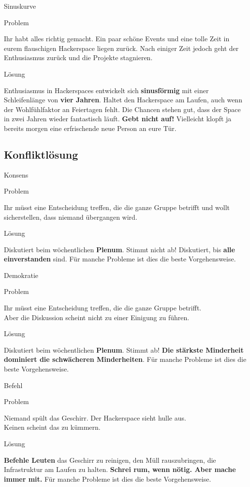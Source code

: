 \documentclass[aspectratio=1610]{beamer}
\newcommand{\pattern}[2]{
  \begin{alertblock}{Problem}
    #1
  \end{alertblock}
  \pause
  \begin{exampleblock}{Lösung}
    #2
  \end{exampleblock}
}
\begin{document}
  \begin{frame}{Sinuskurve}
    \pattern{
      Ihr habt alles richtig gemacht. Ein paar schöne Events und eine tolle
      Zeit in eurem flauschigen Hackerspace liegen zurück. Nach einiger Zeit
      jedoch geht der Enthusiasmus zurück und die Projekte stagnieren.
    }{
      Enthusiasmus in Hackerspaces entwickelt sich \textbf{sinusförmig} mit einer
      Schleifenlänge von \textbf{vier Jahren}. Haltet den Hackerspace am Laufen,
      auch wenn der Wohlfühlfaktor an Feiertagen fehlt. Die Chancen stehen gut,
      dass der Space in zwei Jahren wieder fantastisch läuft. \textbf{Gebt nicht
      auf!} Vielleicht klopft ja bereits morgen eine erfrischende neue Person
      an eure Tür.
    }
  \end{frame}

  \subsection{Konfliktlösung}

  \begin{frame}{Konsens}
    \pattern{
      Ihr müsst eine Entscheidung treffen, die die ganze Gruppe betrifft und
      wollt sicherstellen, dass niemand übergangen wird.
    }{
      Diskutiert beim wöchentlichen \textbf{Plenum}. Stimmt nicht ab!
      Diskutiert, bis \textbf{alle einverstanden} sind. Für manche Probleme ist
      dies die beste Vorgehensweise.
    }
  \end{frame}

  \begin{frame}{Demokratie}
    \pattern{
      Ihr müsst eine Entscheidung treffen, die die ganze Gruppe betrifft.\\
      Aber die Diskussion scheint nicht zu einer Einigung zu führen.
    }{
      Diskutiert beim wöchentlichen \textbf{Plenum}. Stimmt ab!
      \textbf{Die stärkste Minderheit dominiert die schwächeren Minderheiten}.
      Für manche Probleme ist dies die beste Vorgehensweise.
    }
  \end{frame}

  \begin{frame}{Befehl}
    \pattern{
      Niemand spült das Geschirr. Der Hackerspace sieht hulle aus.\\
      Keinen scheint das zu kümmern.
    }{
      \textbf{Befehle Leuten} das Geschirr zu reinigen, den Müll rauszubringen,
      die Infrastruktur am Laufen zu halten. \textbf{Schrei rum, wenn nötig.
      Aber mache immer mit.} Für manche Probleme ist dies die beste
      Vorgehensweise.
    }
  \end{frame}
\end{document}
